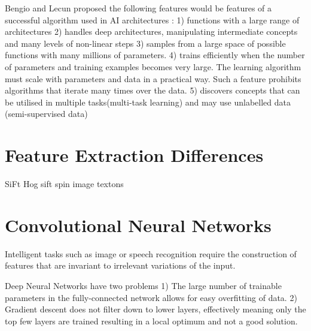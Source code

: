 Bengio and Lecun proposed the following features would be features of a successful algorithm used in AI architectures \citep{bengio2007scaling} \citep{bengio2009learning}\citep{chen2014big}:
1) functions with a large range of architectures
2) handles deep architectures, manipulating intermediate concepts and many levels of non-linear steps
3) samples from a large space of possible functions with many millions of parameters.
4) trains efficiently when the number of parameters and training examples becomes very large. The learning algorithm must scale with parameters and data in a practical way. 
Such a feature prohibits algorithms that iterate many times over the data.
5) discovers concepts that can be utilised in multiple tasks(multi-task learning) and may use unlabelled data (semi-supervised data)



\section{Feature Extraction Differences}



SiFt
Hog
sift spin image textons



    \section{Convolutional Neural Networks}
    
    
    
Intelligent tasks such as image or speech recognition require the construction of features that are invariant to irrelevant variations of the input.

Deep Neural Networks have two problems
1) The large number of trainable parameters in the fully-connected network allows for easy overfitting of data.
2) Gradient descent does not filter down to lower layers, effectively meaning only the top few layers are trained resulting in a local optimum and not a good solution.

